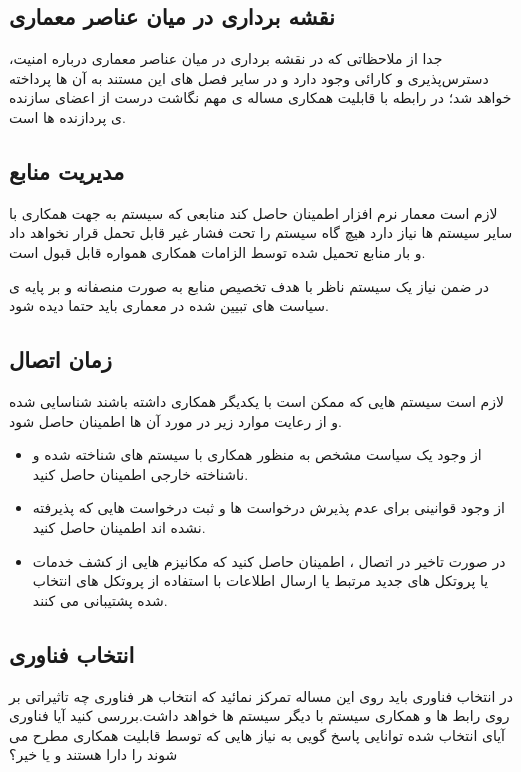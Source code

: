 \subsection{نقشه برداری در میان عناصر معماری}
جدا از ملاحظاتی که در نقشه برداری در میان عناصر معماری درباره امنیت،‌ دسترس‌پذیری و کارائی وجود دارد و در سایر فصل های این مستند به آن ها پرداخته خواهد شد؛ در رابطه با قابلیت همکاری مساله ی مهم نگاشت درست از اعضای سازنده ی پردازنده ها است.
\subsection{مدیریت منابع}
لازم است معمار نرم افزار اطمینان حاصل کند منابعی که سیستم به جهت همکاری با سایر سیستم ها نیاز دارد هیچ گاه سیستم را تحت فشار غیر قابل تحمل قرار نخواهد داد و بار منابع تحمیل شده توسط الزامات همکاری همواره قابل قبول است.

در ضمن نیاز یک سیستم ناظر با هدف تخصیص منابع به صورت منصفانه و بر پایه ی سیاست های تبیین شده در معماری باید حتما دیده شود.
\subsection{زمان اتصال}
لازم است سیستم هایی که ممکن است با یکدیگر همکاری داشته باشند شناسایی شده و از رعایت موارد زیر در مورد آن ها اطمینان حاصل شود.
\begin{itemize}
\item
از وجود یک سیاست مشخص به منظور همکاری با سیستم های شناخته شده و ناشناخته خارجی اطمینان حاصل کنید.
\item
از وجود قوانینی برای عدم پذیرش درخواست ها و ثبت درخواست هایی که پذیرفته نشده اند اطمینان حاصل کنید.
\item
در صورت تاخیر در اتصال ، اطمینان حاصل کنید که مکانیزم هایی از کشف خدمات یا پروتکل های جدید مرتبط یا ارسال اطلاعات با استفاده از پروتکل های انتخاب شده پشتیبانی می کنند.
\end{itemize}
\subsection{انتخاب فناوری}
در انتخاب فناوری باید روی این مساله تمرکز نمائید که انتخاب هر فناوری چه تاثیراتی بر روی رابط ها و همکاری سیستم با دیگر سیستم ها خواهد داشت.بررسی کنید آیا فناوری آیای انتخاب شده توانایی پاسخ گویی به نیاز هایی که توسط قابلیت همکاری مطرح می شوند را دارا هستند و یا خیر؟








